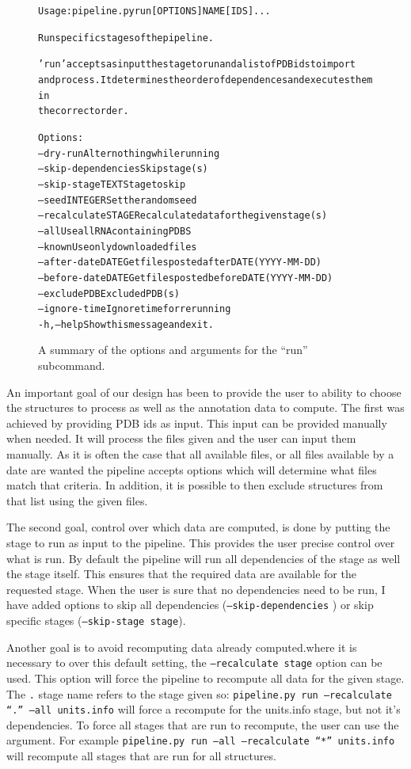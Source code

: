\begin{figure}
\begin{alltt}
Usage: pipeline.py run [OPTIONS] NAME [IDS]...

  Run specific stages of the pipeline.

  'run' accepts as input the stage to run and a list of PDB ids to import
  and process. It determines the order of dependences and executes them in
  the correct order.

Options:
  --dry-run            Alter nothing while running
  --skip-dependencies  Skip stage(s)
  --skip-stage TEXT    Stage to skip
  --seed INTEGER       Set the random seed
  --recalculate STAGE  Recalculate data for the given stage(s)
  --all                Use all RNA containing PDBS
  --known              Use only downloaded files
  --after-date DATE    Get files posted after DATE (YYYY-MM-DD)
  --before-date DATE   Get files posted before DATE (YYYY-MM-DD)
  --exclude PDB        Excluded PDB(s)
  --ignore-time        Ignore time for rerunning
  -h, --help           Show this message and exit.
\end{alltt}
\caption{A summary of the options and arguments for the ``run'' subcommand.}
\label{fig:running-options}
\end{figure}

An important goal of our design has been to provide the user to ability to
choose the structures to process as well as the annotation data to compute. The
first was achieved by providing PDB ids as input. This input can be provided
manually when needed. It will process the files given and the user can input
them manually. As it is often the case that all available files, or all files
available by a date are wanted the pipeline accepts options which will determine
what files match that criteria. In addition, it is possible to then exclude
structures from that list using the given files.

The second goal, control over which data are computed, is done by putting the
stage to run as input to the pipeline. This provides the user precise control
over what is run. By default the pipeline will run all dependencies of the stage
as well the stage itself. This ensures that the required data are available for
the requested stage. When the user is sure that no dependencies need to be run,
I have added options to skip all dependencies ({\tt --skip-dependencies} ) or skip
specific stages ({\tt --skip-stage stage}).

Another goal is to avoid recomputing data already computed.where it is necessary
to over this default setting, the {\tt --recalculate stage} option can be used.
This option will force the pipeline to recompute all data for the given stage.
The {\tt .} stage name refers to the stage given so: {\tt pipeline.py run
--recalculate ``.'' --all units.info} will force a recompute for the units.info
stage, but not it's dependencies. To force all stages that are run to recompute,
the user can use the {\tt *} argument. For example {\tt pipeline.py run --all
--recalculate ``*'' units.info} will recompute all stages that are run for all
structures.


